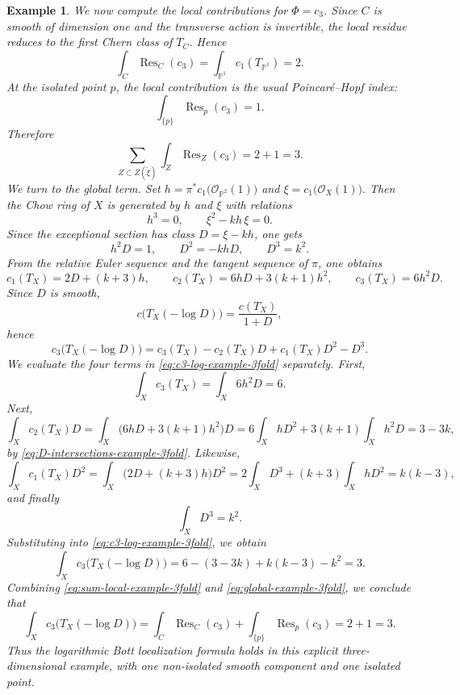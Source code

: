 \documentclass[12pt,a4paper,dvipsnames,x11names]{amsart}
\numberwithin{equation}{section}
\theoremstyle{plain}
\newtheorem{example}[theorem]{Example}
\theoremstyle{definition}
\theoremstyle{remark}
\begin{document}
\begin{example}
We now compute the local contributions for $\Phi=c_3$. Since $C$ is smooth of dimension one and the transverse action is invertible, the local residue reduces to the first Chern class of $T_C$. Hence
\begin{equation}\label{eq:curve-residue-example-3fold}
\int_C \operatorname{Res}_C(c_3)
=
\int_{\mathbb P^1} c_1(T_{\mathbb P^1})
=
2.
\end{equation}
At the isolated point $p$, the local contribution is the usual Poincar\'e--Hopf index:
\begin{equation}\label{eq:point-residue-example-3fold}
\int_{\{p\}}\operatorname{Res}_p(c_3)=1.
\end{equation}
Therefore
\begin{equation}\label{eq:sum-local-example-3fold}
\sum_{Z\subset Z(\widetilde\xi)} \int_Z \operatorname{Res}_Z(c_3)=2+1=3.
\end{equation}
We turn to the global term. Set
$
h=\pi^*c_1\bigl(\mathcal O_{\mathbb P^2}(1)\bigr)
$
and
$
\xi=c_1\bigl(\mathcal O_X(1)\bigr).
$
Then the Chow ring of $X$ is generated by $h$ and $\xi$ with relations
\begin{equation}\label{eq:Chow-ring-example-3fold}
h^3=0,
\qquad
\xi^2-kh\,\xi=0.
\end{equation}
Since the exceptional section has class $D=\xi-kh$, one gets
\begin{equation}\label{eq:D-intersections-example-3fold}
h^2D=1,
\qquad
D^2=-khD,
\qquad
D^3=k^2.
\end{equation}
From the relative Euler sequence and the tangent sequence of $\pi$, one obtains
$$
c_1(T_X)=2D+(k+3)h,
\qquad
c_2(T_X)=6hD+3(k+1)h^2,
\qquad
c_3(T_X)=6h^2D.
$$
Since $D$ is smooth,
$$
c\bigl(T_X(-\log D)\bigr)=\frac{c(T_X)}{1+D},
$$
hence
\begin{equation}\label{eq:c3-log-example-3fold}
c_3\bigl(T_X(-\log D)\bigr)
=
c_3(T_X)-c_2(T_X)D+c_1(T_X)D^2-D^3.
\end{equation}
We evaluate the four terms in \eqref{eq:c3-log-example-3fold} separately. First,
$$
\int_X c_3(T_X)=\int_X 6h^2D=6.
$$
Next,
$$
\int_X c_2(T_X)D
=
\int_X \bigl(6hD+3(k+1)h^2\bigr)D
=
6\int_X hD^2+3(k+1)\int_X h^2D
=
3-3k,
$$
by \eqref{eq:D-intersections-example-3fold}. Likewise,
$$
\int_X c_1(T_X)D^2
=
\int_X \bigl(2D+(k+3)h\bigr)D^2
=
2\int_X D^3+(k+3)\int_X hD^2
=
k(k-3),
$$
and finally
$$
\int_X D^3=k^2.
$$
Substituting into \eqref{eq:c3-log-example-3fold}, we obtain
\begin{equation}\label{eq:global-example-3fold}
\int_X c_3\bigl(T_X(-\log D)\bigr)
=
6-(3-3k)+k(k-3)-k^2
=
3.
\end{equation}
Combining \eqref{eq:sum-local-example-3fold} and \eqref{eq:global-example-3fold}, we conclude that
$$
\int_X c_3\bigl(T_X(-\log D)\bigr)
=
\int_C \operatorname{Res}_C(c_3)
+
\int_{\{p\}}\operatorname{Res}_p(c_3)
=
2+1
=
3.
$$
Thus the logarithmic Bott localization formula holds in this explicit three-dimensional example, with one non-isolated smooth component and one isolated point.
\end{example}
\end{document}
